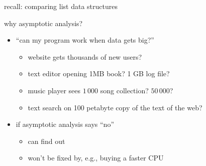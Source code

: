 \begin{frame}{recall: comparing list data structures}
\end{frame}

\begin{frame}{why asymptotic analysis?}
    \begin{itemize}
    \item ``can my program work when data gets big?''
        \begin{itemize}
        \item website gets thousands of new users?
        \item text editor opening 1MB book? 1 GB log file?
        \item music player sees $1\,000$ song collection? $50\,000$?
        \item text search on 100 petabyte copy of the text of the web?
        \end{itemize}
    \item<2-> if asymptotic analysis says ``no''
        \begin{itemize}
            \item can find out 
            \item won't be fixed by, e.g., buying a faster CPU
        \end{itemize}
    \end{itemize}
\end{frame}
